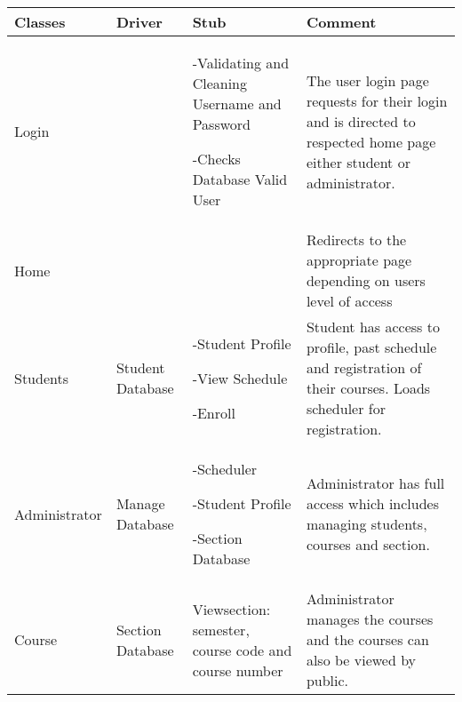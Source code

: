 \begin{longtable}[]{@{}llll@{}}
\toprule
Classes & Driver & Stub & Comment\tabularnewline
\midrule
\endhead
Login & & -Validating and Cleaning Username and Password

-Checks Database Valid User & The user login page requests for their
login and is directed to respected home page either student or
administrator.\tabularnewline
Home & & & Redirects to the appropriate page depending on users level of
access\tabularnewline
Students & Student Database & -Student Profile

-View Schedule

-Enroll & Student has access to profile, past schedule and registration
of their courses. Loads scheduler for registration.\tabularnewline
Administrator & Manage Database & -Scheduler

-Student Profile

-Section Database & Administrator has full access which includes
managing students, courses and section.\tabularnewline
Course & Section Database & Viewsection: semester, course code and
course number & Administrator manages the courses and the courses can
also be viewed by public.\tabularnewline
\bottomrule
\end{longtable}
